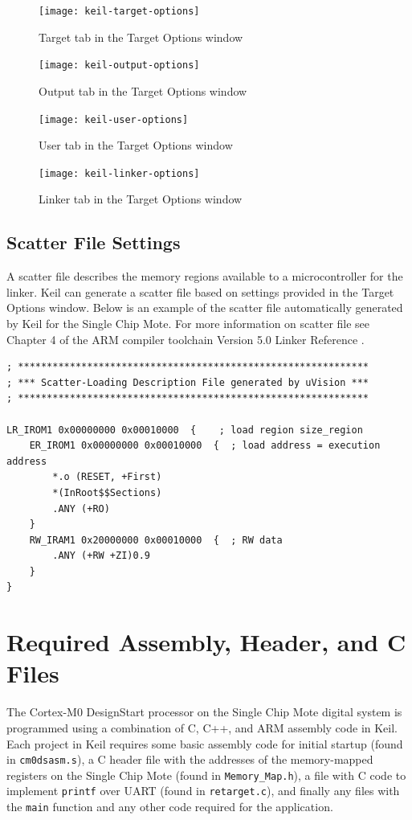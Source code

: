\begin{figure}
\centering
\texttt{[image: keil-target-options]}
\caption{Target tab in the Target Options window}
\label{fig:keil-target-options}
\end{figure}

\begin{figure}
\centering
\texttt{[image: keil-output-options]}
\caption{Output tab in the Target Options window}
\label{fig:keil-output-options}
\end{figure}

\begin{figure}
\centering
\texttt{[image: keil-user-options]}
\caption{User tab in the Target Options window}
\label{fig:keil-user-options}
\end{figure}

\begin{figure}
\centering
\texttt{[image: keil-linker-options]}
\caption{Linker tab in the Target Options window}
\label{fig:keil-linker-options}
\end{figure}

\subsection{Scatter File Settings}
A scatter file describes the memory regions available to a microcontroller for the linker. Keil can generate a scatter file based on settings provided in the Target Options window. Below is an example of the scatter file automatically generated by Keil for the Single Chip Mote. For more information on scatter file see Chapter 4 of the ARM compiler toolchain Version 5.0 Linker Reference \cite{linker-reference}.

\begin{lstlisting}
; *************************************************************
; *** Scatter-Loading Description File generated by uVision ***
; *************************************************************

LR_IROM1 0x00000000 0x00010000  {    ; load region size_region
    ER_IROM1 0x00000000 0x00010000  {  ; load address = execution address
        *.o (RESET, +First)
        *(InRoot$$Sections)
        .ANY (+RO)
    }
    RW_IRAM1 0x20000000 0x00010000  {  ; RW data
        .ANY (+RW +ZI)0.9
    }
}
\end{lstlisting}

\section{Required Assembly, Header, and C Files}
The Cortex-M0 DesignStart processor on the Single Chip Mote digital system is programmed using a combination of C, C++, and ARM assembly code in Keil. Each project in Keil requires some basic assembly code for initial startup (found in \texttt{cm0dsasm.s}), a C header file with the addresses of the memory-mapped registers on the Single Chip Mote (found in \texttt{Memory\_Map.h}), a file with C code to implement \texttt{printf} over UART (found in \texttt{retarget.c}), and finally any files with the \texttt{main} function and any other code required for the application.

